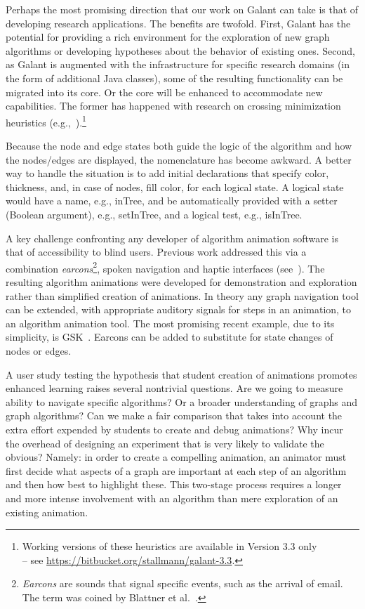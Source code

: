 Perhaps the most promising direction that our work on Galant can take is that
of developing research applications.  The benefits are twofold.  First,
Galant has the potential for providing a rich environment for the exploration
of new graph algorithms or developing hypotheses about the behavior of
existing ones.  Second, as Galant is augmented with the infrastructure for
specific research domains (in the form of additional Java classes), some of the
resulting functionality can be migrated into its core. Or the core
will be enhanced to accommodate new capabilities. The former
has happened with research on crossing
minimization heuristics (e.g.,~\cite{2012-JEA-Stallmann}).\footnote{
  Working versions of these heuristics are available in Version 3.3 only\\ --
  see \mbox{\url{https://bitbucket.org/stallmann/galant-3.3}.}
}

  Because the node and edge states both guide the logic of the algorithm
  and how the nodes/edges are displayed, the nomenclature has become awkward.
  A better way to handle the situation is to add initial declarations
  that specify color, thickness, and, in case of nodes, fill color, for each logical state.
  A logical state would have a name, e.g., \textsf{inTree},
  and be automatically provided with a setter (Boolean argument),
  e.g., \textsf{setInTree}, and a logical test, e.g., \textsf{isInTree}.

A key challenge confronting any developer of algorithm animation
software is that of accessibility to blind users.
Previous work addressed this via a combination \emph{earcons}\footnote{
\emph{Earcons} are sounds that signal specific events, such as the arrival of email. The term was coined by Blattner et al.~\cite{1989-HCI-Blattner-earcons}.
}, spoken navigation
and haptic interfaces
(see~\cite{2002-SoftViz-Baloian,2005-SCCC-Baloian,2002-Diagrams-Bennett}).
The resulting algorithm animations were developed for demonstration and exploration rather than simplified
creation of
animations.
In theory any graph navigation tool can be extended, with appropriate auditory
signals for steps in an animation, to an algorithm animation tool.
The most promising recent example, due to its simplicity, is GSK~\cite{2013-SIGCSE-Balik}.
Earcons can be added to substitute for state changes of nodes or edges.

A user study testing the hypothesis that student creation of animations
promotes enhanced learning raises several nontrivial questions.
Are we going to measure ability to navigate specific algorithms? Or a broader
understanding of graphs and graph algorithms?
Can we make a fair comparison that takes into account the
extra effort expended by students to create and debug animations?
Why incur the overhead of designing an experiment that is very likely to validate the obvious?
Namely:
in order to create a compelling animation,
an animator must first decide what aspects of a graph are important
at each step of an algorithm and then how best to highlight these.
This two-stage process requires a longer and more intense involvement
with an algorithm than mere exploration of an existing animation.

